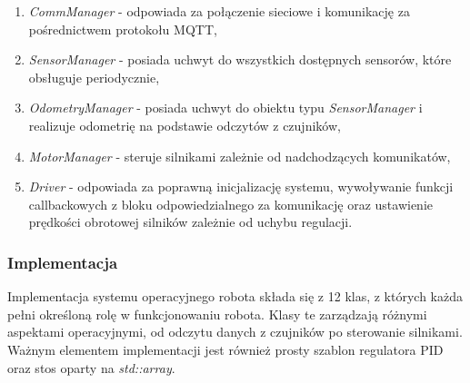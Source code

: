 \documentclass[12pt,twoside]{article}
\begin{document}
\begin{enumerate}[label=\alph*), leftmargin=1.25cm]
	\item \textit{CommManager} - odpowiada za połączenie sieciowe i komunikację za pośrednictwem protokołu MQTT,
	\item \textit{SensorManager} - posiada uchwyt do wszystkich dostępnych sensorów, które obsługuje periodycznie,
	\item \textit{OdometryManager} - posiada uchwyt do obiektu typu \textit{SensorManager} i realizuje odometrię na podstawie odczytów z czujników,
	\item \textit{MotorManager} - steruje silnikami zależnie od nadchodzących komunikatów,
	\item \textit{Driver} - odpowiada za poprawną inicjalizację systemu, wywoływanie funkcji callbackowych z bloku odpowiedzialnego za komunikację oraz ustawienie prędkości obrotowej silników zależnie od uchybu regulacji.  
\end{enumerate}

\subsubsection{Implementacja}
Implementacja systemu operacyjnego robota składa się z 12 klas, z których każda pełni określoną rolę w funkcjonowaniu robota. Klasy te zarządzają różnymi aspektami operacyjnymi, od odczytu danych z czujników po sterowanie silnikami. Ważnym elementem implementacji jest również prosty szablon regulatora PID oraz stos oparty na \textit{std::array}\cite{stdarray}.
\end{document}
